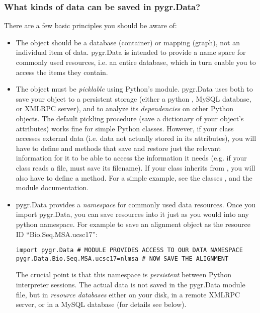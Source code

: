 \documentclass{howto}
\begin{document}
\subsubsection{What kinds of data can be saved in pygr.Data?}
There are a few basic principles you should be aware of:
\begin{itemize}
\item The object should be a database (container) or mapping (graph),
not an individual item of data.  pygr.Data is intended to provide
a name space for commonly used resources, i.e. an entire database,
which in turn enable you to access the items they contain.

\item The object must be {\em picklable} using Python's 
module.  pygr.Data uses  both to save your object to 
a persistent storage (either a python , MySQL database,
or XMLRPC server), and to analyze its {\em dependencies} on other
Python objects.  The default pickling procedure (save a dictionary of
your object's attributes) works fine for simple Python classes.
However, if your class accesses external data (i.e. data not actually
stored in its attributes), you will have to define 
and  methods that save and restore just the 
relevant information for it to be able to access the information
it needs (e.g. if your class reads a file,  must
save its filename).  If your class inherits from , you
will also have to define a  method.  For a simple
example, see the classes , and the  module documentation.

\item pygr.Data provides a {\em namespace} for commonly used data resources.
Once you import pygr.Data, you can save resources into it just as you would into
any python namespace.  For example to save an alignment object 
as the resource ID ``Bio.Seq.MSA.ucsc17'':
\begin{verbatim}
import pygr.Data # MODULE PROVIDES ACCESS TO OUR DATA NAMESPACE
pygr.Data.Bio.Seq.MSA.ucsc17=nlmsa # NOW SAVE THE ALIGNMENT
\end{verbatim}
The crucial point is that this namespace is {\em persistent} between
Python interpreter sessions.  The actual data is not saved in the pygr.Data 
module file, but in {\em resource databases} either on your disk, in
a remote XMLRPC server, or in a MySQL database (for details see below).


\end{itemize}
\end{document}
